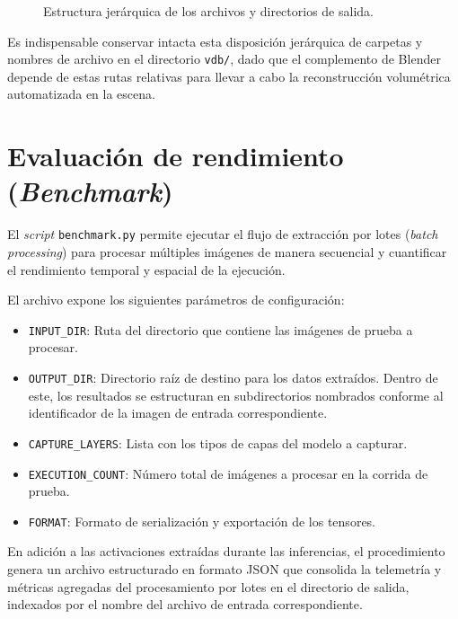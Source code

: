 \begin{figure}[!htbp]
\caption{Estructura jerárquica de los archivos y directorios de salida.}
\label{fig:arbol_salida}
\end{figure}

Es indispensable conservar intacta esta disposición jerárquica de carpetas y nombres de archivo en el directorio 
\texttt{vdb/}, dado que el complemento de Blender depende de estas rutas relativas para llevar a cabo la reconstrucción 
volumétrica automatizada en la escena.

\section{Evaluación de rendimiento (\textit{Benchmark})}
El \textit{script} \texttt{benchmark.py} permite ejecutar el flujo de extracción por lotes (\textit{batch processing}) para procesar 
múltiples imágenes de manera secuencial y cuantificar el rendimiento temporal y espacial de la ejecución.
\medskip

El archivo expone los siguientes parámetros de configuración:
\begin{itemize}
    \item \texttt{INPUT\_DIR}: Ruta del directorio que contiene las imágenes de prueba a procesar.
    \item \texttt{OUTPUT\_DIR}: Directorio raíz de destino para los datos extraídos. Dentro de este, los 
    resultados se estructuran en subdirectorios nombrados conforme al identificador de la imagen de entrada correspondiente.
    \item \texttt{CAPTURE\_LAYERS}: Lista con los tipos de capas del modelo a capturar.
    \item \texttt{EXECUTION\_COUNT}: Número total de imágenes a procesar en la corrida de prueba.
    \item \texttt{FORMAT}: Formato de serialización y exportación de los tensores.
\end{itemize}

En adición a las activaciones extraídas durante las inferencias, el procedimiento genera un archivo estructurado en formato 
JSON que consolida la telemetría y métricas agregadas del procesamiento por lotes en el directorio de salida, indexados
por el nombre del archivo de entrada correspondiente. 
\medskip

